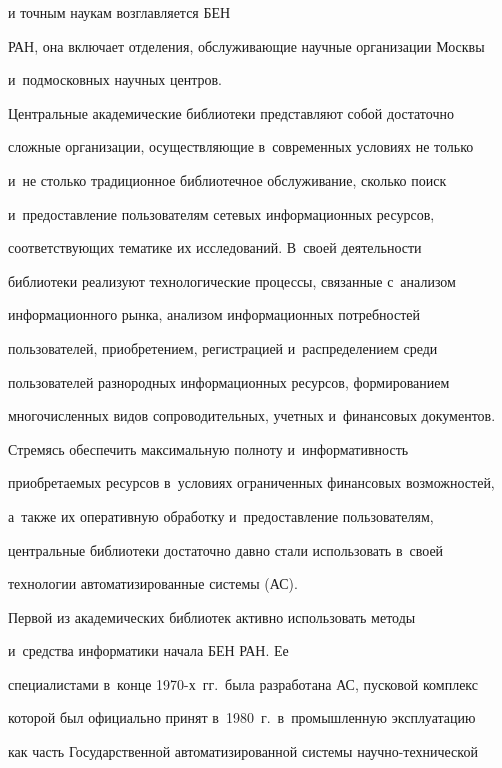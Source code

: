 и точным наукам возглавляется БЕН 


РАН, она включает отделения, обслуживающие научные организации Москвы 


и~подмосковных научных центров.





  


  Центральные академические библиотеки представляют собой достаточно 


сложные организации, осуществляющие в~современных условиях не только 


и~не столько традиционное библиотечное обслуживание, сколько поиск 


и~пред\-остав\-ле\-ние пользователям сетевых информационных ресурсов, 


со\-от\-вет\-ст\-ву\-ющих тематике их исследований. В~своей деятельности 


библиотеки реализуют технологические процессы, связанные с~анализом 


информационного рынка, анализом информационных потребностей 


пользователей, приобретением, регистрацией и~распределением среди 


пользователей разнородных информационных ресурсов, формированием 


многочисленных видов сопроводительных, учетных и~финансовых документов. 


%  


  Стремясь обеспечить максимальную полноту и~информативность 


приобретаемых ресурсов в~условиях ограниченных финансовых возможностей, 


а~также их оперативную обработку и~предоставление пользователям, 


центральные библиотеки достаточно давно стали использовать в~своей 


технологии автоматизированные системы (АС). 


  


  Первой из академических библиотек активно использовать методы 


и~средства информатики начала БЕН РАН. Ее 


специалистами в~конце 1970-х~гг.\ была разработана АС, пусковой комплекс 


которой был официально принят в~1980~г.\ в~промышленную эксплуатацию 


как часть Государственной автоматизированной системы на\-уч\-но-тех\-ни\-че\-ской 


